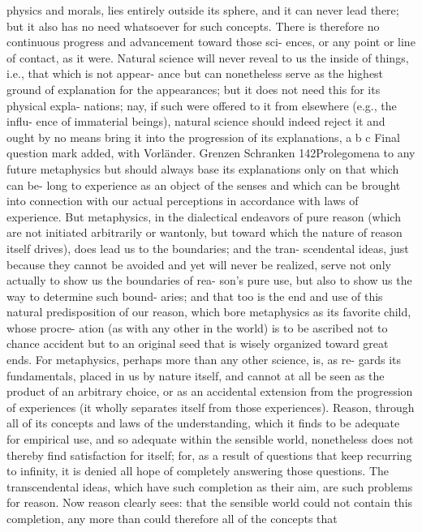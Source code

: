 physics and morals, lies entirely outside its sphere, and it can never lead
there; but it also has no need whatsoever for such concepts. There is
therefore no continuous progress and advancement toward those sci-
ences, or any point or line of contact, as it were. Natural science will
never reveal to us the inside of things, i.e., that which is not appear-
ance but can nonetheless serve as the highest ground of explanation
for the appearances; but it does not need this for its physical expla-
nations; nay, if such were offered to it from elsewhere (e.g., the inﬂu-
ence of immaterial beings), natural science should indeed reject it and
ought by no means bring it into the progression of its explanations,
a
b
c
Final question mark added, with Vorländer.
Grenzen
Schranken
142Prolegomena to any future metaphysics
but should always base its explanations only on that which can be-
long to experience as an object of the senses and which can be brought
into connection with our actual perceptions in accordance with laws of
experience.
But metaphysics, in the dialectical endeavors of pure reason (which
are not initiated arbitrarily or wantonly, but toward which the nature
of reason itself drives), does lead us to the boundaries; and the tran-
scendental ideas, just because they cannot be avoided and yet will never
be realized, serve not only actually to show us the boundaries of rea-
son’s pure use, but also to show us the way to determine such bound-
aries; and that too is the end and use of this natural predisposition of
our reason, which bore metaphysics as its favorite child, whose procre-
ation (as with any other in the world) is to be ascribed not to chance
accident but to an original seed that is wisely organized toward great
ends. For metaphysics, perhaps more than any other science, is, as re-
gards its fundamentals, placed in us by nature itself, and cannot at all be
seen as the product of an arbitrary choice, or as an accidental extension
from the progression of experiences (it wholly separates itself from those
experiences).
Reason, through all of its concepts and laws of the understanding,
which it ﬁnds to be adequate for empirical use, and so adequate within the
sensible world, nonetheless does not thereby ﬁnd satisfaction for itself;
for, as a result of questions that keep recurring to inﬁnity, it is denied
all hope of completely answering those questions. The transcendental
ideas, which have such completion as their aim, are such problems for
reason. Now reason clearly sees: that the sensible world could not contain
this completion, any more than could therefore all of the concepts that
